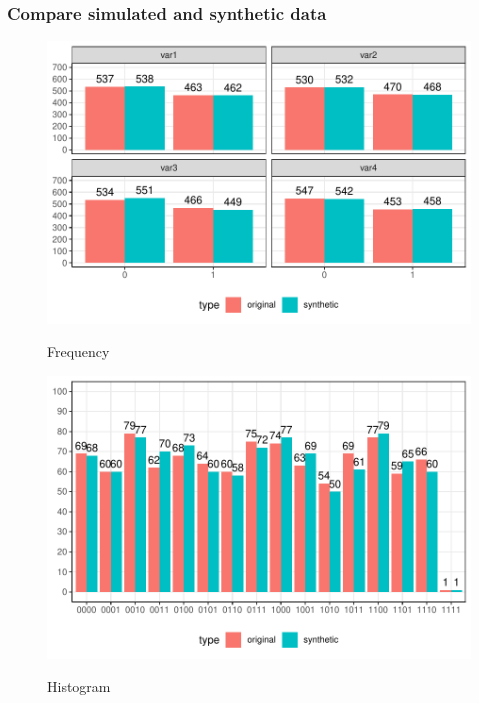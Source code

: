 \documentclass[t,8pt,utfx8]{beamer}
\begin{document}
\begin{spacing}{1.25}
\begin{frame}[t]\frametitle{Compare simulated and synthetic data}
\begin{minipage}{0.48\textwidth}
    \begin{figure}
        \centering
        \caption{Frequency}
        \includegraphics[width=\textwidth]{../../graphs/graph_cart_frequency_compare.pdf}
        \label{fig:frequency_compare}
    \end{figure}
\end{minipage}
\hfill
\begin{minipage}{0.48\textwidth}
    \begin{figure}
        \centering
        \caption{Histogram}
        \includegraphics[width=\textwidth]{../../graphs/graph_cart_histogram_compare.pdf}
        \label{fig:histogram_compare}
    \end{figure}
\end{minipage}
\end{frame}


\end{spacing}
\end{document}
